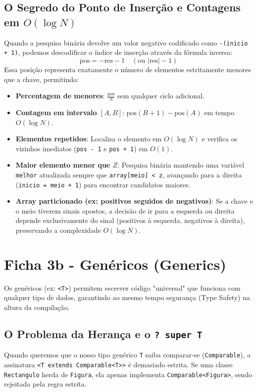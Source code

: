 \documentclass[12pt,a4paper]{article}
\begin{document}
\begin{enumerate}
\subsection*{O Segredo do Ponto de Inserção e Contagens em $O(\log N)$}
Quando a pesquisa binária devolve um valor negativo codificado como \texttt{-(inicio + 1)}, podemos descodificar o índice de inserção através da fórmula inversa:
\[
\text{pos} = -\text{res} - 1 \quad (\text{ou } |\text{res}| - 1)
\]
Essa posição representa exatamente o número de elementos estritamente menores que a chave, permitindo:
\begin{itemize}
    \item \textbf{Percentagem de menores}: $\frac{\text{pos}}{N}$ sem qualquer ciclo adicional.
    \item \textbf{Contagem em intervalo $[A, B]$}: $\text{pos}(B + 1) - \text{pos}(A)$ em tempo $O(\log N)$.
    \item \textbf{Elementos repetidos}: Localiza o elemento em $O(\log N)$ e verifica os vizinhos imediatos (\texttt{pos - 1} e \texttt{pos + 1}) em $O(1)$.
    \item \textbf{Maior elemento menor que $Z$}: Pesquisa binária mantendo uma variável \texttt{melhor} atualizada sempre que \texttt{array[meio] < z}, avançando para a direita (\texttt{inicio = meio + 1}) para encontrar candidatos maiores.
    \item \textbf{Array particionado (ex: positivos seguidos de negativos)}: Se a chave e o meio tiverem sinais opostos, a decisão de ir para a esquerda ou direita depende exclusivamente do sinal (positivos à esquerda, negativos à direita), preservando a complexidade $O(\log N)$.
\end{itemize}



\section{Ficha 3b - Genéricos (Generics)}
Os genéricos (ex: \texttt{<T>}) permitem escrever código "universal" que funciona com qualquer tipo de dados, garantindo ao mesmo tempo segurança (Type Safety) na altura da compilação.

\subsection*{O Problema da Herança e o \texttt{? super T}}
Quando queremos que o nosso tipo genérico \texttt{T} saiba comparar-se (\texttt{Comparable}), a assinatura \texttt{<T extends Comparable<T>>} é demasiado estrita. Se uma classe \texttt{Rectangulo} herda de \texttt{Figura}, ela apenas implementa \texttt{Comparable<Figura>}, sendo rejeitada pela regra estrita.


\end{enumerate}
\end{document}
